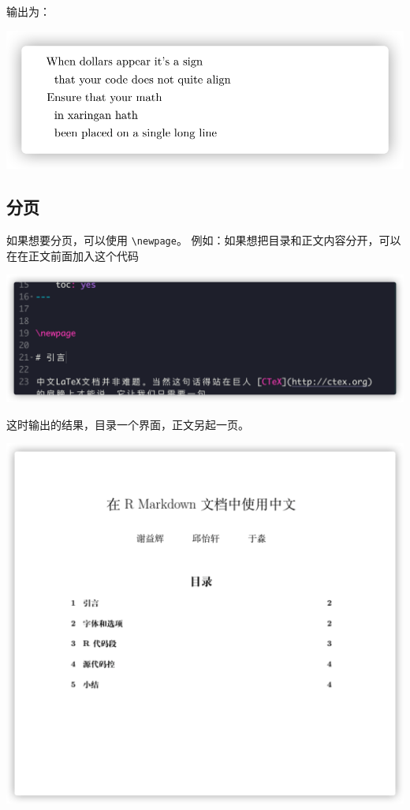 \documentclass[
]{book}
\begin{document}
输出为：

\includegraphics{images/paste-7C36FD52.png}

\hypertarget{ux5206ux9875}{%
\subsection{分页}\label{ux5206ux9875}}

如果想要分页，可以使用 \texttt{\textbackslash{}newpage}。
例如：如果想把目录和正文内容分开，可以在在正文前面加入这个代码

\includegraphics{images/paste-F27FC37A.png}

这时输出的结果，目录一个界面，正文另起一页。

\includegraphics{images/paste-020985AB.png}
\end{document}
